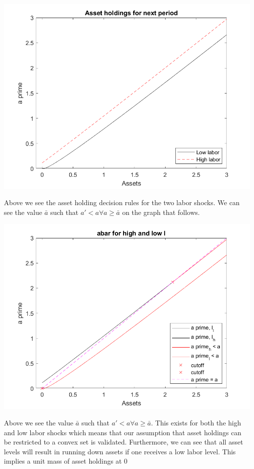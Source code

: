 \documentclass[11pt]{article} %
\begin{document}
\includegraphics{aprime}

Above we see the asset holding decision rules for the two labor shocks. We can see the value $\bar{a}$ such that $a'<a \forall a\geq \bar{a}$ on the graph that follows.

\includegraphics{abar}

Above we see the value $\bar{a}$ such that $a'<a \forall a\geq \bar{a}$. This exists for both the high and low labor shocks which means that our assumption that asset holdings can be restricted to a convex set is validated. Furthermore, we can see that all asset levels will result in running down assets if one receives a low labor level. This implies a unit mass of asset holdings at 0
\end{document}
